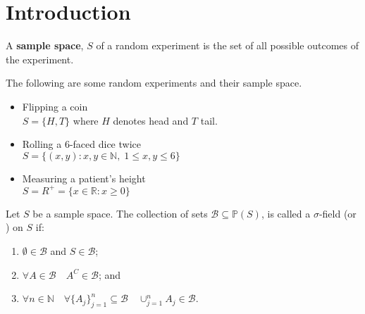 \documentclass[notoc,notitlepage]{tufte-book}
\begin{document}
\section{Introduction} %
\label{sec:introduction}

\begin{defn}\label{defn:sample_space}
  A \textbf{sample space}, \textbf{$S$} of a random experiment is the set of all possible outcomes of the experiment.
\end{defn}

\begin{eg}
  \label{eg:sample_space_eg}
  The following are some random experiments and their sample space.
  \begin{itemize}
    \item Flipping a coin\\
      $S = \{H, T\}$ where $H$ denotes head and $T$ tail.
    \item Rolling a 6-faced dice twice\\
      $S = \{(x, y) : x, y \in \mathbb{N}, \; 1 \leq x, y \leq 6 \}$
    \item Measuring a patient's height\\
      $S = R^+ = \{x \in \mathbb{R} : x \geq 0\}$
  \end{itemize}
\end{eg}

\begin{defn}\label{defn:sigma_field}
  Let $S$ be a sample space. The collection of sets $\mathscr{B} \subseteq \mathbb{P}(S)$, is called a $\sigma$-field (or ) on $S$ if:
  \begin{enumerate}
    \item $\emptyset \in \mathscr{B}$ and $S \in \mathscr{B}$;
    \item $\forall A \in \mathscr{B} \quad A^C \in \mathscr{B}$;  and
    \item $\forall n \in \mathbb{N} \quad \forall \{A_j\}_{j = 1}^{n} \subseteq \mathscr{B} \quad \cup_{j=1}^{n} A_j \in \mathscr{B}$.
  \end{enumerate}
\end{defn}
\end{document}
